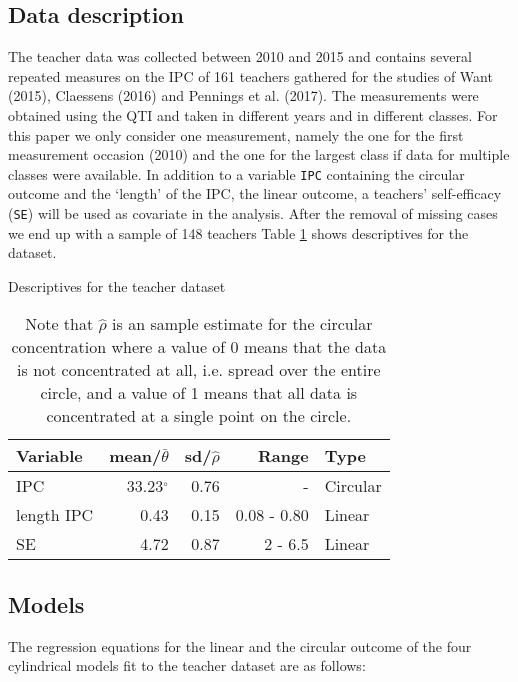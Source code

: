 \documentclass[11pt,]{article}
\begin{document}
\subsection{Data description}\label{DataDescriptives}

The teacher data was collected between 2010 and 2015 and contains
several repeated measures on the IPC of 161 teachers gathered for the
studies of Want (2015), Claessens (2016) and Pennings et al. (2017). The
measurements were obtained using the QTI and taken in different years
and in different classes. For this paper we only consider one
measurement, namely the one for the first measurement occasion (2010)
and the one for the largest class if data for multiple classes were
available. In addition to a variable \texttt{IPC} containing the
circular outcome and the `length' of the IPC, the linear outcome, a
teachers' self-efficacy (\verb|SE|) will be used as covariate in the
analysis. After the removal of missing cases we end up with a sample of
148 teachers Table \ref{Tableteacherdescriptives} shows descriptives for
the dataset.

\begin{table}
\centering
\caption{Descriptives for the teacher dataset} 
\begin{tabular}{lrrrl}
  \noalign{\smallskip}\hline\noalign{\smallskip}
Variable & mean/$\bar{\theta}$ & sd/$\hat{\rho}$ & Range & Type \\ \hline\noalign{\smallskip}
IPC &33.23$^\circ$& 0.76 & - & Circular\\
length IPC & 0.43 & 0.15 & 0.08 - 0.80 & Linear\\
SE & 4.72 & 0.87 & 2 - 6.5 & Linear\\
   \hline
\end{tabular}
\label{Tableteacherdescriptives}
\caption*{Note that $\hat{\rho}$ is an sample estimate for the circular concentration where a value of 0 means that the data is not concentrated at all, i.e. spread over the entire circle, and a value of 1 means that all data is concentrated at a single point on the circle. }
\end{table}

\subsection{Models}\label{DataModels}

The regression equations for the linear and the circular outcome of the
four cylindrical models fit to the teacher dataset are as follows:
\end{document}

